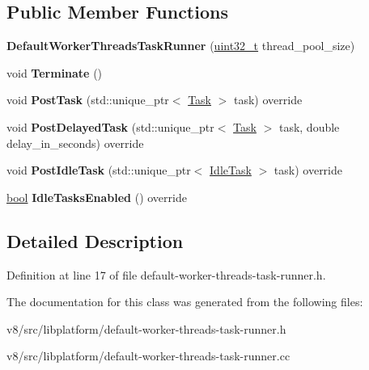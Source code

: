 \subsection*{Public Member Functions}
\begin{DoxyCompactItemize}
\item 
\mbox{\label{classv8_1_1platform_1_1DefaultWorkerThreadsTaskRunner_aae269bfa17495ee1a0c23e55903de26f}} 
{\bfseries Default\+Worker\+Threads\+Task\+Runner} (\mbox{\hyperlink{classuint32__t}{uint32\+\_\+t}} thread\+\_\+pool\+\_\+size)
\item 
\mbox{\label{classv8_1_1platform_1_1DefaultWorkerThreadsTaskRunner_ac35fa60bba435ff234db280fef76e812}} 
void {\bfseries Terminate} ()
\item 
\mbox{\label{classv8_1_1platform_1_1DefaultWorkerThreadsTaskRunner_a807fc380a66e9ecad1c9602613aa9068}} 
void {\bfseries Post\+Task} (std\+::unique\+\_\+ptr$<$ \mbox{\hyperlink{classv8_1_1Task}{Task}} $>$ task) override
\item 
\mbox{\label{classv8_1_1platform_1_1DefaultWorkerThreadsTaskRunner_acf39abb41b22432309b39ab354c04475}} 
void {\bfseries Post\+Delayed\+Task} (std\+::unique\+\_\+ptr$<$ \mbox{\hyperlink{classv8_1_1Task}{Task}} $>$ task, double delay\+\_\+in\+\_\+seconds) override
\item 
\mbox{\label{classv8_1_1platform_1_1DefaultWorkerThreadsTaskRunner_ab276ba34083fbc3dc09d8b2ea2cfc206}} 
void {\bfseries Post\+Idle\+Task} (std\+::unique\+\_\+ptr$<$ \mbox{\hyperlink{classv8_1_1IdleTask}{Idle\+Task}} $>$ task) override
\item 
\mbox{\label{classv8_1_1platform_1_1DefaultWorkerThreadsTaskRunner_a79d355ee5a3bd7fa54b85f5590ea3aaf}} 
\mbox{\hyperlink{classbool}{bool}} {\bfseries Idle\+Tasks\+Enabled} () override
\end{DoxyCompactItemize}


\subsection{Detailed Description}


Definition at line 17 of file default-\/worker-\/threads-\/task-\/runner.\+h.



The documentation for this class was generated from the following files\+:\begin{DoxyCompactItemize}
\item 
v8/src/libplatform/default-\/worker-\/threads-\/task-\/runner.\+h\item 
v8/src/libplatform/default-\/worker-\/threads-\/task-\/runner.\+cc\end{DoxyCompactItemize}
